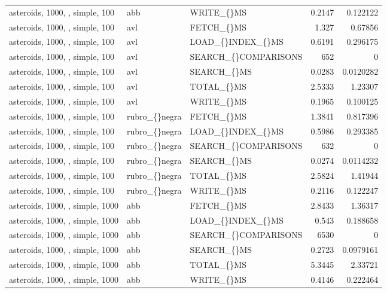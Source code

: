 \begin{longtable}{p{4cm}p{1.4cm}p{2.6cm}rr}
asteroids, 1000, , simple, 100 & abb & WRITE\_\allowbreak\{\}MS & 0.2147 & 0.122122\\
asteroids, 1000, , simple, 100 & avl & FETCH\_\allowbreak\{\}MS & 1.327 & 0.67856\\
asteroids, 1000, , simple, 100 & avl & LOAD\_\allowbreak\{\}INDEX\_\allowbreak\{\}MS & 0.6191 & 0.296175\\
asteroids, 1000, , simple, 100 & avl & SEARCH\_\allowbreak\{\}COMPARISONS & 652 & 0\\
asteroids, 1000, , simple, 100 & avl & SEARCH\_\allowbreak\{\}MS & 0.0283 & 0.0120282\\
asteroids, 1000, , simple, 100 & avl & TOTAL\_\allowbreak\{\}MS & 2.5333 & 1.23307\\
asteroids, 1000, , simple, 100 & avl & WRITE\_\allowbreak\{\}MS & 0.1965 & 0.100125\\
asteroids, 1000, , simple, 100 & rubro\_\allowbreak\{\}negra & FETCH\_\allowbreak\{\}MS & 1.3841 & 0.817396\\
asteroids, 1000, , simple, 100 & rubro\_\allowbreak\{\}negra & LOAD\_\allowbreak\{\}INDEX\_\allowbreak\{\}MS & 0.5986 & 0.293385\\
asteroids, 1000, , simple, 100 & rubro\_\allowbreak\{\}negra & SEARCH\_\allowbreak\{\}COMPARISONS & 632 & 0\\
asteroids, 1000, , simple, 100 & rubro\_\allowbreak\{\}negra & SEARCH\_\allowbreak\{\}MS & 0.0274 & 0.0114232\\
asteroids, 1000, , simple, 100 & rubro\_\allowbreak\{\}negra & TOTAL\_\allowbreak\{\}MS & 2.5824 & 1.41944\\
asteroids, 1000, , simple, 100 & rubro\_\allowbreak\{\}negra & WRITE\_\allowbreak\{\}MS & 0.2116 & 0.122247\\
asteroids, 1000, , simple, 1000 & abb & FETCH\_\allowbreak\{\}MS & 2.8433 & 1.36317\\
asteroids, 1000, , simple, 1000 & abb & LOAD\_\allowbreak\{\}INDEX\_\allowbreak\{\}MS & 0.543 & 0.188658\\
asteroids, 1000, , simple, 1000 & abb & SEARCH\_\allowbreak\{\}COMPARISONS & 6530 & 0\\
asteroids, 1000, , simple, 1000 & abb & SEARCH\_\allowbreak\{\}MS & 0.2723 & 0.0979161\\
asteroids, 1000, , simple, 1000 & abb & TOTAL\_\allowbreak\{\}MS & 5.3445 & 2.33721\\
asteroids, 1000, , simple, 1000 & abb & WRITE\_\allowbreak\{\}MS & 0.4146 & 0.222464\\

\end{longtable}
